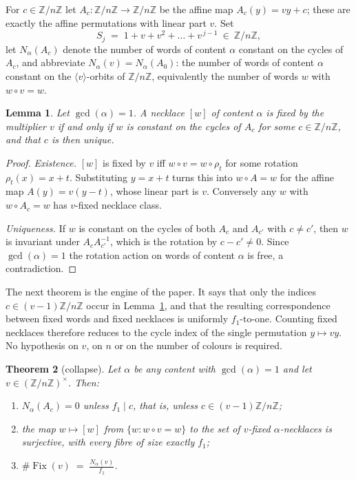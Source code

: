 \documentclass[11pt,a4paper]{article}
\theoremstyle{plain}
\newtheorem{theorem}{Theorem}[section]
\newtheorem{lemma}[theorem]{Lemma}
\theoremstyle{definition}
\theoremstyle{remark}
\newcommand{\Z}{\mathbb{Z}}
\newcommand{\Zn}{\Z/n\Z}
\newcommand{\units}[1]{(\Z/#1\Z)^{\times}}
\newcommand{\Fix}{\operatorname{Fix}}
\begin{document}
For $c\in\Zn$ let $A_c:\Zn\to\Zn$ be the affine map $A_c(y)=vy+c$; these are exactly the
affine permutations with linear part $v$. Set
\[
  S_j \;=\; 1+v+v^2+\dots+v^{\,j-1}\ \in\ \Zn ,
\]
let $N_\alpha(A_c)$ denote the number of words of content $\alpha$ constant on the cycles of
$A_c$, and abbreviate $N_\alpha(v)=N_\alpha(A_0)$: the number of words of content $\alpha$
constant on the $\langle v\rangle$-orbits of $\Zn$, equivalently the number of words $w$
with $w\circ v=w$.

\begin{lemma}\label{lem:disjoint}
Let $\gcd(\alpha)=1$. A necklace $[w]$ of content $\alpha$ is fixed by the multiplier $v$ if
and only if $w$ is constant on the cycles of $A_c$ for some $c\in\Zn$, and that $c$ is then
unique.
\end{lemma}

\begin{proof}
\emph{Existence.} $[w]$ is fixed by $v$ iff $w\circ v=w\circ\rho_t$ for some rotation
$\rho_t(x)=x+t$. Substituting $y=x+t$ turns this into $w\circ A=w$ for the affine map
$A(y)=v(y-t)$, whose linear part is $v$. Conversely any $w$ with $w\circ A_c=w$ has
$v$-fixed necklace class.

\emph{Uniqueness.} If $w$ is constant on the cycles of both $A_c$ and $A_{c'}$ with $c\ne
c'$, then $w$ is invariant under $A_cA_{c'}^{-1}$, which is the rotation by $c-c'\ne0$.
Since $\gcd(\alpha)=1$ the rotation action on words of content $\alpha$ is free, a
contradiction.
\end{proof}

The next theorem is the engine of the paper. It says that only the indices $c\in(v-1)\Zn$
occur in Lemma~\ref{lem:disjoint}, and that the resulting correspondence between fixed words
and fixed necklaces is uniformly $f_1$-to-one. Counting fixed necklaces therefore reduces to
the cycle index of the single permutation $y\mapsto vy$. No hypothesis on $v$, on $n$ or on
the number of colours is required.

\begin{theorem}[collapse]\label{thm:collapse}
Let $\alpha$ be any content with $\gcd(\alpha)=1$ and let $v\in\units{n}$. Then:
\begin{enumerate}
\item[\textup{(i)}] $N_\alpha(A_c)=0$ unless $f_1\mid c$, that is, unless $c\in(v-1)\Zn$;
\item[\textup{(ii)}] the map $w\mapsto[w]$ from $\{w:w\circ v=w\}$ to the set of $v$-fixed
      $\alpha$-necklaces is surjective, with every fibre of size exactly $f_1$;
\item[\textup{(iii)}] $\displaystyle\#\Fix(v)\;=\;\frac{N_\alpha(v)}{f_1}$.
\end{enumerate}
\end{theorem}
\end{document}
